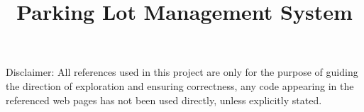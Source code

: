 \documentclass[12pt]{article}
\title{Parking Lot Management System}
\begin{document}
\mktitle
\setcounter{page}{1}
\tableofcontents
\newpage
\setcounter{page}{1}
\pagestyle{plain}






  \pagebreak
  
  
  \noindent \scriptsize Disclaimer: All references used in this project are only for the purpose of guiding the direction of exploration and ensuring correctness, any code appearing in the referenced web pages has not been used directly, unless explicitly stated. 
\end{document}
